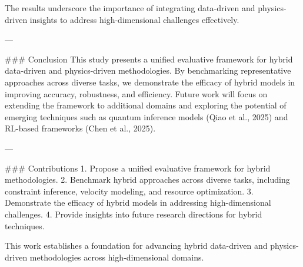 The results underscore the importance of integrating data-driven and physics-driven insights to address high-dimensional challenges effectively.  

---

### Conclusion  
This study presents a unified evaluative framework for hybrid data-driven and physics-driven methodologies. By benchmarking representative approaches across diverse tasks, we demonstrate the efficacy of hybrid models in improving accuracy, robustness, and efficiency. Future work will focus on extending the framework to additional domains and exploring the potential of emerging techniques such as quantum inference models (Qiao et al., 2025) and RL-based frameworks (Chen et al., 2025).  

---

### Contributions  
1. Propose a unified evaluative framework for hybrid methodologies.  
2. Benchmark hybrid approaches across diverse tasks, including constraint inference, velocity modeling, and resource optimization.  
3. Demonstrate the efficacy of hybrid models in addressing high-dimensional challenges.  
4. Provide insights into future research directions for hybrid techniques.  

This work establishes a foundation for advancing hybrid data-driven and physics-driven methodologies across high-dimensional domains.  
